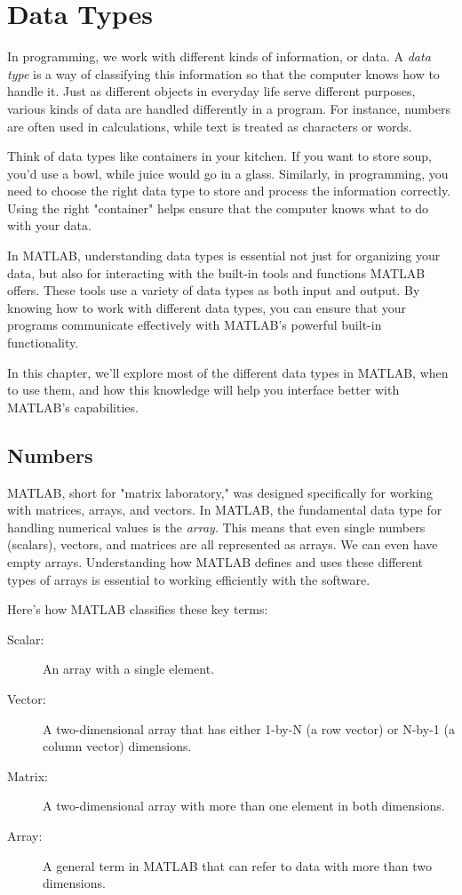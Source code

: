 \chapter{Data Types}
\label{c:datatypes}


In programming, we work with different kinds of information, or data. A \emph{data type} is a way of classifying this information so that the computer knows how to handle it. Just as different objects in everyday life serve different purposes, various kinds of data are handled differently in a program. For instance, numbers are often used in calculations, while text is treated as characters or words.

Think of data types like containers in your kitchen. If you want to store soup, you’d use a bowl, while juice would go in a glass. Similarly, in programming, you need to choose the right data type to store and process the information correctly. Using the right "container" helps ensure that the computer knows what to do with your data.

In MATLAB, understanding data types is essential not just for organizing your data, but also for interacting with the built-in tools and functions MATLAB offers. These tools use a variety of data types as both input and output. By knowing how to work with different data types, you can ensure that your programs communicate effectively with MATLAB’s powerful built-in functionality.

In this chapter, we'll explore most of the different data types in MATLAB, when to use them, and how this knowledge will help you interface better with MATLAB's capabilities.

\section{Numbers}

MATLAB, short for "matrix laboratory," was designed specifically for working with matrices, arrays, and vectors. In MATLAB, the fundamental data type for handling numerical values is the \emph{array}. This means that even single numbers (scalars), vectors, and matrices are all represented as arrays. We can even have empty arrays.  Understanding how MATLAB defines and uses these different types of arrays is essential to working efficiently with the software.

Here’s how MATLAB classifies these key terms:

\begin{description}
\item[Scalar:] An array with a single element.
\item[Vector:] A two-dimensional array that has either 1-by-N (a row vector) or N-by-1 (a column vector) dimensions.
\item[Matrix:] A two-dimensional array with more than one element in both dimensions.
\item[Array:] A general term in MATLAB that can refer to data with more than two dimensions.
\end{description}

